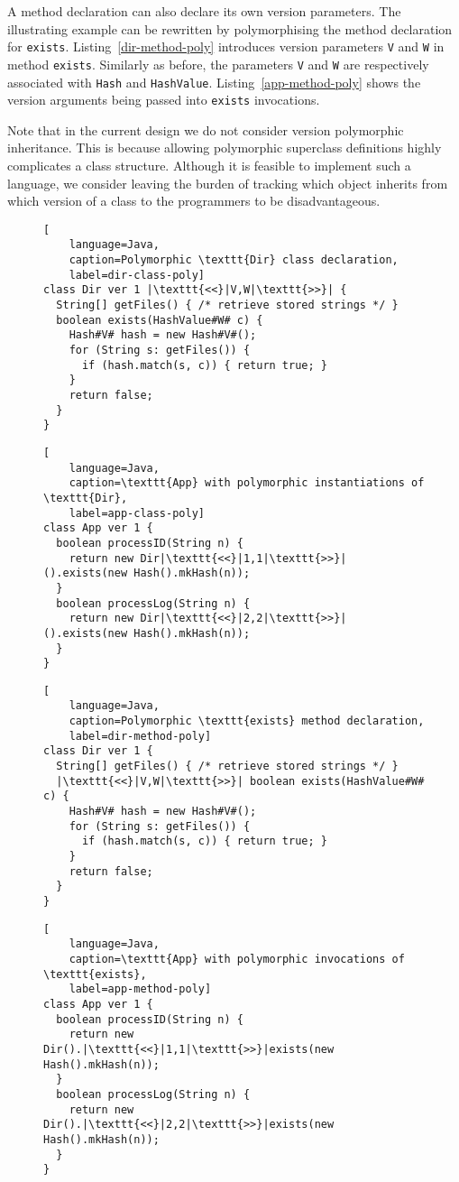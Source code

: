 A method declaration can also declare its own version parameters. The illustrating example can be rewritten 
by polymorphising the method declaration for \texttt{exists}. Listing~\ref{dir-method-poly} introduces 
version parameters \texttt{V} and \texttt{W} in method \texttt{exists}. Similarly as before, the parameters 
\texttt{V} and \texttt{W} are respectively associated with \texttt{Hash} and \texttt{HashValue}. 
Listing~\ref{app-method-poly} shows the version arguments being passed into \texttt{exists} invocations.

Note that in the current design we do not consider version polymorphic inheritance. 
This is because allowing polymorphic superclass definitions highly complicates a class structure. 
Although it is feasible to implement such a language, we consider 
leaving the burden of tracking which object inherits 
from which version of a class to the programmers to be disadvantageous.

\begin{figure}[h!]
\begin{lstlisting}[
    language=Java,
    caption=Polymorphic \texttt{Dir} class declaration,
    label=dir-class-poly]
class Dir ver 1 |\texttt{<<}|V,W|\texttt{>>}| {
  String[] getFiles() { /* retrieve stored strings */ }
  boolean exists(HashValue#W# c) {
    Hash#V# hash = new Hash#V#();
    for (String s: getFiles()) {
      if (hash.match(s, c)) { return true; }
    }
    return false;
  }
}
\end{lstlisting}

\begin{lstlisting}[
    language=Java,
    caption=\texttt{App} with polymorphic instantiations of \texttt{Dir},
    label=app-class-poly]
class App ver 1 {
  boolean processID(String n) {
    return new Dir|\texttt{<<}|1,1|\texttt{>>}|().exists(new Hash().mkHash(n));
  }
  boolean processLog(String n) {
    return new Dir|\texttt{<<}|2,2|\texttt{>>}|().exists(new Hash().mkHash(n));
  }
}
\end{lstlisting}
\end{figure}

\begin{figure}[h!]
\begin{lstlisting}[
    language=Java,
    caption=Polymorphic \texttt{exists} method declaration,
    label=dir-method-poly]
class Dir ver 1 {
  String[] getFiles() { /* retrieve stored strings */ }
  |\texttt{<<}|V,W|\texttt{>>}| boolean exists(HashValue#W# c) {
    Hash#V# hash = new Hash#V#();
    for (String s: getFiles()) {
      if (hash.match(s, c)) { return true; }
    }
    return false;
  }
}
\end{lstlisting}

\begin{lstlisting}[
    language=Java,
    caption=\texttt{App} with polymorphic invocations of \texttt{exists},
    label=app-method-poly]
class App ver 1 {
  boolean processID(String n) {
    return new Dir().|\texttt{<<}|1,1|\texttt{>>}|exists(new Hash().mkHash(n));
  }
  boolean processLog(String n) {
    return new Dir().|\texttt{<<}|2,2|\texttt{>>}|exists(new Hash().mkHash(n));
  }
}
\end{lstlisting}
\end{figure}


